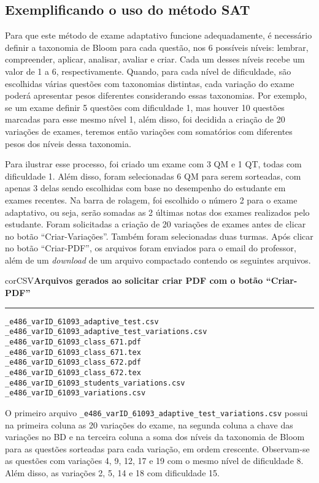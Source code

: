 \subsection*{Exemplificando o uso do método SAT}

Para que este método de exame adaptativo funcione adequadamente, é necessário definir a taxonomia de Bloom para cada questão, nos 6 possíveis níveis: lembrar, compreender, aplicar, analisar, avaliar e criar. Cada um desses níveis recebe um valor de 1 a 6, respectivamente. Quando, para cada nível de dificuldade, são escolhidas várias questões com taxonomias distintas, cada variação do exame poderá apresentar pesos diferentes considerando essas taxonomias. Por exemplo, se um exame definir 5 questões com dificuldade 1, mas houver 10 questões marcadas para esse mesmo nível 1, além disso, foi decidida a criação de 20 variações de exames, teremos então variações com somatórios com diferentes pesos dos níveis dessa taxonomia.

Para ilustrar esse processo, foi criado um exame com 3 QM e 1 QT, todas com dificuldade 1. Além disso, foram selecionadas 6 QM para serem sorteadas, com apenas 3 delas sendo escolhidas com base no desempenho do estudante em exames recentes. Na barra de rolagem, foi escolhido o número 2 para o exame adaptativo, ou seja, serão somadas as 2 últimas notas dos exames realizados pelo estudante. Foram solicitadas a criação de 20 variações de exames antes de clicar no botão ``Criar-Variações''. Também foram selecionadas duas turmas. Após clicar no botão ``Criar-PDF'', os arquivos foram enviados para o email do professor, além de um \textit{download} de um arquivo compactado contendo os seguintes arquivos.

\begin{myboxCode}{corCSV}{\textbf{Arquivos gerados ao solicitar criar PDF com o botão ``Criar-PDF''}}\vspace{3mm}
\hrule
\begin{verbatim}
_e486_varID_61093_adaptive_test.csv
_e486_varID_61093_adaptive_test_variations.csv
_e486_varID_61093_class_671.pdf
_e486_varID_61093_class_671.tex
_e486_varID_61093_class_672.pdf
_e486_varID_61093_class_672.tex
_e486_varID_61093_students_variations.csv
_e486_varID_61093_variations.csv
\end{verbatim}
\end{myboxCode}

O primeiro arquivo \verb|_e486_varID_61093_adaptive_test_variations.csv| possui na primeira coluna as 20 variações do exame, na segunda coluna a chave das variações no BD e na terceira coluna a soma dos níveis da taxonomia de Bloom para as questões sorteadas para cada variação, em ordem crescente. Observam-se as questões com variações 4, 9, 12, 17 e 19 com o mesmo nível de dificuldade 8. Além disso, as variações 2, 5, 14 e 18 com dificuldade 15.


